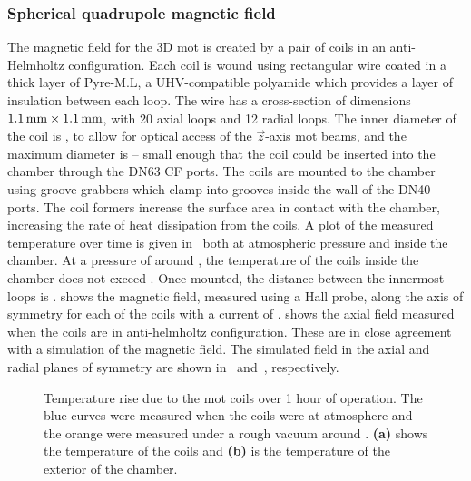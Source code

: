 \subsubsection{Spherical quadrupole magnetic field}
The magnetic field for the 3D \ac{mot} is created by a pair of coils in an
anti-Helmholtz configuration. Each coil is wound using rectangular wire coated in a
 thick layer of Pyre-M.L, a UHV-compatible polyamide
which provides a layer of insulation between each loop. The wire has a
cross-section of dimensions \(\sivalue{1.1}{\milli\metre} \times
\sivalue{1.1}{\milli\metre}\), with 20 axial loops and 12 radial loops. The
inner diameter of the coil is , to allow for optical
access of the \(\vec{z}\)-axis \ac{mot} beams, and the maximum diameter is
 -- small enough that the coil could be
inserted into the chamber through the DN63 CF ports. The coils are mounted to
the chamber using groove grabbers which clamp into grooves inside the wall of
the DN40 ports. The coil formers increase the surface area in contact with the chamber, increasing the rate of heat dissipation from the coils. A plot of the measured temperature over time is given in~ both at atmospheric pressure and inside the chamber. At a pressure of around  , the temperature of the coils inside the chamber does not exceed . Once mounted, the distance between the innermost
loops is .  shows the
magnetic field, measured using a Hall probe, along the axis of symmetry for each
of the coils with a current of .  shows the axial field measured when the coils are in anti-helmholtz configuration. These are in close
agreement with a simulation of the magnetic field. The simulated field in the axial and radial planes of symmetry are shown
in~ and~, respectively.
\begin{figure}[!htbp]
	\centering
	\def\svgwidth{\columnwidth}
	\label{fig:mot_coil_temp}
	\label{fig:mot_coil_temp_tg4}
	\caption[\ac{mot} coil temperature rise]{Temperature rise due to the \ac{mot} coils over 1 hour of operation. The blue curves were measured when the coils were at atmosphere and the orange were measured under a rough vacuum around . \textbf{(a)} shows the temperature of the coils and \textbf{(b)} is the temperature of the exterior of the chamber.}
	\label{fig:mot_coil_temp_both}
\end{figure}
